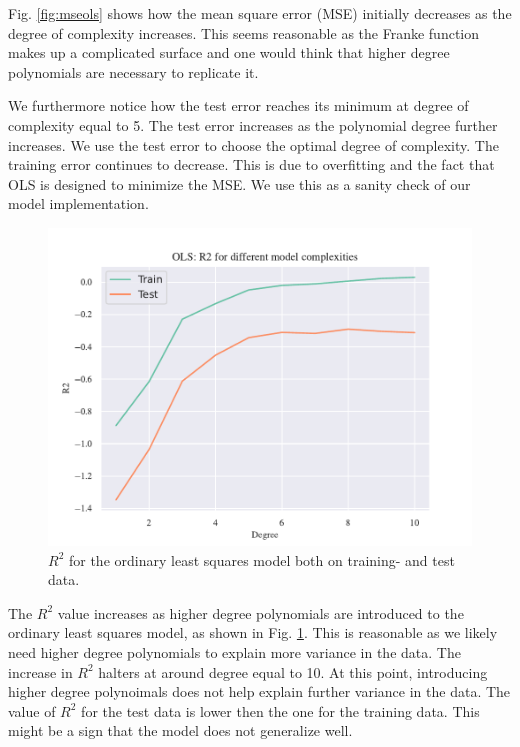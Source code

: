 Fig. \ref{fig:mseols} shows how the mean square error (MSE) initially decreases as the degree of complexity increases. This seems reasonable as the Franke function makes up a complicated surface and one would think that higher degree polynomials are necessary to replicate it. 

We furthermore notice how the test error reaches its minimum at degree of complexity equal to 5. The test error increases as the polynomial degree further increases. We use the test error to choose the optimal degree of complexity. The training error continues to decrease. This is due to overfitting and the fact that OLS is designed to minimize the MSE. We use this as a sanity check of our model implementation.

\begin{figure}[h!]
    \centering
    \includegraphics[width=1\linewidth]{project_1/figures/figures_in_report/OLS_R2_Franke_Noise.pdf}
    \caption{$R^2$ for the ordinary least squares model both on training- and test data.}
    \label{fig:r2ols}
\end{figure}

The $R^2$ value increases as higher degree polynomials are introduced to the ordinary least squares model, as shown in Fig. \ref{fig:r2ols}. This is reasonable as we likely need higher degree polynomials to explain more variance in the data. The increase in $R^2$ halters at around degree equal to 10. At this point, introducing higher degree polynoimals does not help explain further variance in the data. The value of $R^2$ for the test data is lower then the one for the training data. This might be a sign that the model does not generalize well. 


